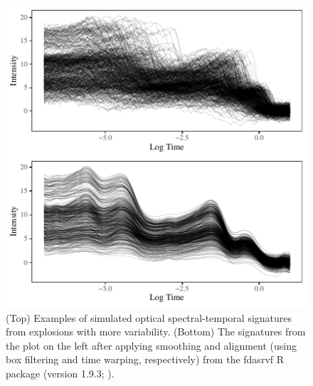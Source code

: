 \documentclass[letterpaper]{article}
\begin{document}
\begin{figure}[t]
\centering
\includegraphics[width=.95\columnwidth]{fig7}
\caption{(Top) Examples of simulated optical spectral-temporal signatures from explosions with more variability. (Bottom) The signatures from the plot on the left after applying smoothing and alignment (using box filtering and time warping, respectively) from the fdasrvf R package (version 1.9.3; \citeauthor{tucker:2020} \citeyear{tucker:2020}).}
\label{fig7}
\end{figure}
\end{document}
